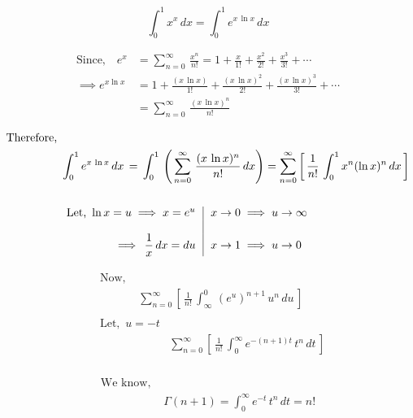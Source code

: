 \documentclass[12pt, a4paper]{article}
\begin{document}
\[
\int_{0}^{1} x^x \, dx = \int_{0}^{1} e^{x\,\ln x} \, dx
\]

\begin{align*}
    \text{Since,} \quad
    e^x &= \sum_{n=0}^{\infty} \, \frac{x^n}{n!}
    = 1 + \frac{x}{1!} + \frac{x^2}{2!} + \frac{x^3}{3!} + \cdots \\
    \implies e^{x\ln x} &= 1 + \frac{(x\,\ln x)}{1!} + \frac{(x\,\ln x)^2}{2!} + \frac{(x\,\ln x)^3}{3!} + \cdots \\
    &= \sum_{n=0}^{\infty} \, \frac{(x\,\ln x)^n}{n!}
\end{align*}

\begin{align*}
    \text{Therefore, } & \\
    &\int_{0}^{1} e^{x\,\ln x} \, dx \, 
    = \, \int_{0}^{1}\, \left(\, \sum_{n=0}^{\infty} \, \frac{(x \,\ln x)^n}{n!} \,dx \right)
    = \sum_{n=0}^{\infty} \left[\, \frac{1}{n!} \, \int_{0}^{1} x^n(\ln x)^n \,dx \, \right] \\
    \\ & \begin{array}{r | l}
        \text{Let, } \ln x = u \implies x = e^u \,
        & \, x \to 0 \implies u \to \infty\\
        \\\implies \, \dfrac{1}{x} \, dx = du \,
        & \, x \to 1 \implies u \to 0
    \end{array}
\end{align*}

\begin{align*}
    &\begin{aligned}
        \text{Now, }& \\ 
        &\sum_{n=0}^{\infty} \left[ \, \frac{1}{n!} \, \int_{\infty}^{0} \, (e^u)^{n+1} \,u^n \, du \, \right]
    \end{aligned}
    \\
    &\begin{aligned}
    \text{Let, } \, u = -t &\\ 
    &\sum_{n=0}^{\infty} \left[\, \frac{1}{n!} \, \int_{0}^{\infty} e^{-(n+1)t}\, t^n \,dt\, \right] \\
    \end{aligned}
\end{align*}

\begin{align*}
    \text{We know, }& \\
    &\Gamma (n+1) = \int_{0}^{\infty}e^{-t}\,t^{n}\,dt = n!
\end{align*}
\end{document}
